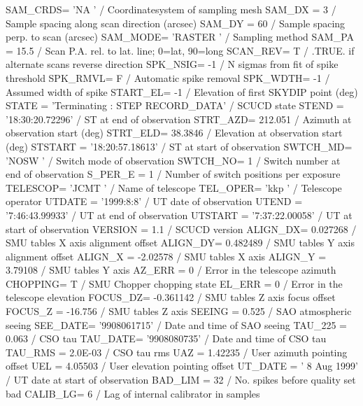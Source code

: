 \documentclass[twoside,11pt,nolof]{starlink}
\begin{document}
\begin{small}
\begin{terminalv}
SAM_CRDS= 'NA      '           / Coordinatesystem of sampling mesh
SAM_DX  =                    3 / Sample spacing along scan direction (arcsec)
SAM_DY  =                   60 / Sample spacing perp. to scan (arcsec)
SAM_MODE= 'RASTER  '           / Sampling method
SAM_PA  =                 15.5 / Scan P.A. rel. to lat. line; 0=lat, 90=long
SCAN_REV=                    T / .TRUE. if alternate scans reverse direction
SPK_NSIG=                   -1 / N sigmas from fit of spike threshold
SPK_RMVL=                    F / Automatic spike removal
SPK_WDTH=                   -1 / Assumed width of spike
START_EL=                   -1 / Elevation of first SKYDIP point (deg)
STATE   = 'Terminating         :   STEP RECORD_DATA' / SCUCD state
STEND   = '18:30:20.72296'     / ST at end of observation
STRT_AZD=              212.051 / Azimuth at observation start (deg)
STRT_ELD=              38.3846 / Elevation at observation start (deg)
STSTART = '18:20:57.18613'     / ST at start of observation
SWTCH_MD= 'NOSW    '           / Switch mode of observation
SWTCH_NO=                    1 / Switch number at end of observation
S_PER_E =                    1 / Number of switch positions per exposure
TELESCOP= 'JCMT    '           / Name of telescope
TEL_OPER= 'kkp     '           / Telescope operator
UTDATE  = '1999:8:8'           / UT date of observation
UTEND   = '7:46:43.99933'      / UT at end of observation
UTSTART = '7:37:22.00058'      / UT at start of observation
VERSION =                  1.1 / SCUCD version
ALIGN_DX=             0.027268 / SMU tables X axis alignment offset
ALIGN_DY=             0.482489 / SMU tables Y axis alignment offset
ALIGN_X =             -2.02578 / SMU tables X axis
ALIGN_Y =              3.79108 / SMU tables Y axis
AZ_ERR  =                    0 / Error in the telescope azimuth
CHOPPING=                    T / SMU Chopper chopping state
EL_ERR  =                    0 / Error in the telescope elevation
FOCUS_DZ=            -0.361142 / SMU tables Z axis focus offset
FOCUS_Z =              -16.756 / SMU tables Z axis
SEEING  =                0.525 / SAO atmospheric seeing
SEE_DATE= '9908061715'         / Date and time of SAO seeing
TAU_225 =                0.063 / CSO tau
TAU_DATE= '9908080735'         / Date and time of CSO tau
TAU_RMS =              2.0E-03 / CSO tau rms
UAZ     =              1.42235 / User azimuth pointing offset
UEL     =              4.05503 / User elevation pointing offset
UT_DATE = ' 8 Aug 1999'        / UT date at start of observation
BAD_LIM =                   32 / No. spikes before quality set bad
CALIB_LG=                    6 / Lag of internal calibrator in samples

\end{terminalv}
\end{small}
\end{document}
